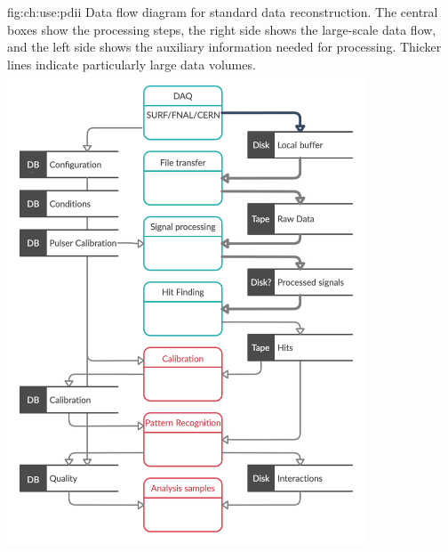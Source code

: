 \documentclass[../main-v1.tex]{subfiles}
\begin{document}

\begin{dunefigure}
{fig:ch:use:pdii}
{Data flow diagram for standard  data reconstruction. The central boxes show the processing steps, the right side shows the large-scale data flow,  and the left side shows the auxiliary information needed for processing. Thicker lines indicate particularly large data volumes.}
\includegraphics[width=0.8\textwidth]{graphics/IntroFigures/Data_processing_FD_v3.png}
\end{dunefigure}

\end{document}
